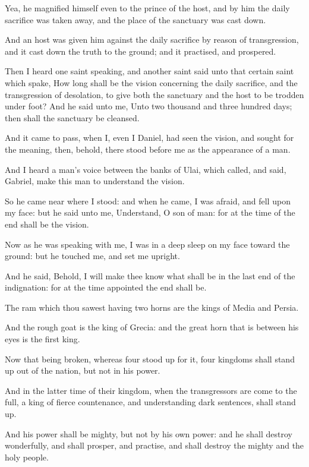 \verse Yea, he magnified himself even to the prince of the host, and by him the daily sacrifice was taken away, and the place of the sanctuary was cast down.

\verse And an host was given him against the daily sacrifice by reason of transgression, and it cast down the truth to the ground; and it practised, and prospered.

\verse Then I heard one saint speaking, and another saint said unto that certain saint which spake, How long shall be the vision concerning the daily sacrifice, and the transgression of desolation, to give both the sanctuary and the host to be trodden under foot?  \verse And he said unto me, Unto two thousand and three hundred days; then shall the sanctuary be cleansed.

\verse And it came to pass, when I, even I Daniel, had seen the vision, and sought for the meaning, then, behold, there stood before me as the appearance of a man.

\verse And I heard a man's voice between the banks of Ulai, which called, and said, Gabriel, make this man to understand the vision.

\verse So he came near where I stood: and when he came, I was afraid, and fell upon my face: but he said unto me, Understand, O son of man: for at the time of the end shall be the vision.

\verse Now as he was speaking with me, I was in a deep sleep on my face toward the ground: but he touched me, and set me upright.

\verse And he said, Behold, I will make thee know what shall be in the last end of the indignation: for at the time appointed the end shall be.

\verse The ram which thou sawest having two horns are the kings of Media and Persia.

\verse And the rough goat is the king of Grecia: and the great horn that is between his eyes is the first king.

\verse Now that being broken, whereas four stood up for it, four kingdoms shall stand up out of the nation, but not in his power.

\verse And in the latter time of their kingdom, when the transgressors are come to the full, a king of fierce countenance, and understanding dark sentences, shall stand up.

\verse And his power shall be mighty, but not by his own power: and he shall destroy wonderfully, and shall prosper, and practise, and shall destroy the mighty and the holy people.

